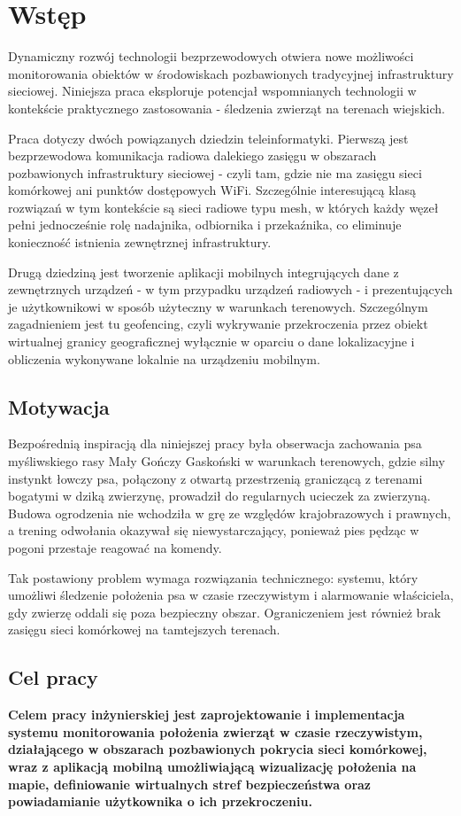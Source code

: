 \newpage
\section{Wstęp}
Dynamiczny rozwój technologii bezprzewodowych otwiera nowe możliwości monitorowania obiektów w 
środowiskach pozbawionych tradycyjnej infrastruktury sieciowej. Niniejsza praca eksploruje 
potencjał wspomnianych technologii w kontekście praktycznego zastosowania - śledzenia zwierząt na terenach wiejskich.

Praca dotyczy dwóch powiązanych dziedzin teleinformatyki. Pierwszą jest bezprzewodowa komunikacja
radiowa dalekiego zasięgu w obszarach pozbawionych infrastruktury sieciowej - czyli tam, gdzie nie ma
zasięgu sieci komórkowej ani punktów dostępowych WiFi. Szczególnie interesującą klasą rozwiązań
w tym kontekście są sieci radiowe typu mesh, w których każdy węzeł pełni jednocześnie rolę nadajnika,
odbiornika i przekaźnika, co eliminuje konieczność istnienia zewnętrznej infrastruktury.

Drugą dziedziną jest tworzenie aplikacji mobilnych integrujących dane z zewnętrznych urządzeń -
w tym przypadku urządzeń radiowych - i prezentujących je użytkownikowi w sposób użyteczny
w warunkach terenowych. Szczególnym zagadnieniem jest tu geofencing, czyli wykrywanie przekroczenia
przez obiekt wirtualnej granicy geograficznej wyłącznie w oparciu o dane lokalizacyjne i obliczenia
wykonywane lokalnie na urządzeniu mobilnym.

\subsection*{Motywacja}

Bezpośrednią inspiracją dla niniejszej pracy była obserwacja zachowania psa myśliwskiego rasy 
Mały Gończy Gaskoński w warunkach terenowych, gdzie silny
instynkt łowczy psa, połączony z otwartą przestrzenią graniczącą z terenami bogatymi w dziką
zwierzynę, prowadził do regularnych ucieczek za zwierzyną. Budowa ogrodzenia nie wchodziła w grę
ze względów krajobrazowych i prawnych, a trening odwołania okazywał się niewystarczający, ponieważ
pies pędząc w pogoni przestaje reagować na komendy.

Tak postawiony problem wymaga rozwiązania technicznego: systemu, który umożliwi śledzenie położenia
psa w czasie rzeczywistym i alarmowanie właściciela, gdy zwierzę oddali się poza bezpieczny obszar.
Ograniczeniem jest również brak zasięgu sieci komórkowej na tamtejszych terenach.

\subsection*{Cel pracy}

\textbf{Celem pracy inżynierskiej jest zaprojektowanie i implementacja systemu monitorowania
położenia zwierząt w czasie rzeczywistym, działającego w obszarach pozbawionych pokrycia sieci
komórkowej, wraz z aplikacją mobilną umożliwiającą wizualizację położenia na mapie, definiowanie
wirtualnych stref bezpieczeństwa oraz powiadamianie użytkownika o ich przekroczeniu.}
